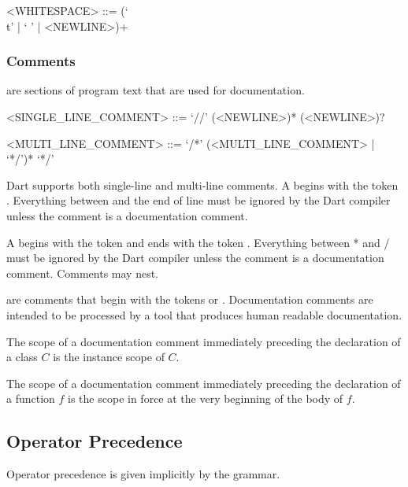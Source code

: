 \documentclass[makeidx]{article}
\begin{document}
{\begin{grammar}
<WHITESPACE> ::= (`\\t' | ` ' | <NEWLINE>)+
\end{grammar}


\subsubsection{Comments}

\LMHash{}%
are sections of program text that are used for documentation.

\begin{grammar}
<SINGLE\_LINE\_COMMENT> ::= `//' \gtilde{}(<NEWLINE>)* (<NEWLINE>)?

<MULTI\_LINE\_COMMENT> ::= \gnewline{}
  `/*' (<MULTI\_LINE\_COMMENT> | \gtilde{} `*/')* `*/'
\end{grammar}

\LMHash{}%
Dart supports both single-line and multi-line comments.
A  begins with the token \code{//}.
Everything between \code{//} and the end of line must be ignored by the Dart compiler unless the comment is a documentation comment.

\LMHash{}%
A  begins with the token \code{/*} and ends with the token \code{*/}.
Everything between \code{/}* and \code{*}/ must be ignored by the Dart compiler unless the comment is a documentation comment.
Comments may nest.

\LMHash{}%
are comments that begin with the tokens \code{///} or \code{/**}.
Documentation comments are intended to be processed by a tool that produces human readable documentation.

\LMHash{}%
The scope of a documentation comment immediately preceding the declaration of a class $C$ is the instance scope of $C$.

\LMHash{}%
The scope of a documentation comment immediately preceding the declaration of a function $f$ is the scope in force at the very beginning of the body of $f$.


\subsection{Operator Precedence}

\LMHash{}%
Operator precedence is given implicitly by the grammar.

}
\end{document}
